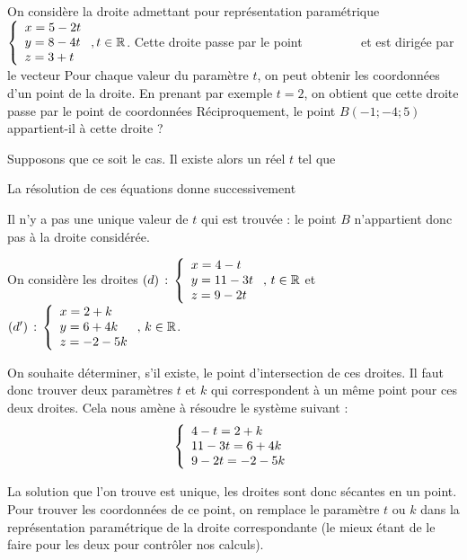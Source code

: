 \documentclass[11pt,fleqn, openany]{book} %
\begin{document}
\begin{example}On considère la droite admettant pour représentation paramétrique $ \left\{\renewcommand{\arraystretch}{1} \begin{array}{l}x=5-2t \\ y=8-4t \\ z =3+t \\

\end{array}\right., t \in \mathbb{R}$.
Cette droite passe par le point $\qquad\qquad$ et est dirigée par le vecteur 
\vskip20pt
Pour chaque valeur du paramètre $t$, on peut obtenir les coordonnées d'un point de la droite. En prenant par exemple $t=2$, on obtient que cette droite passe par le point de coordonnées
\vskip10pt
Réciproquement, le point $B(-1;-4;5)$ appartient-il à cette droite ? 

Supposons que ce soit le cas. Il existe alors un réel $t$ tel que

\vskip20pt

La résolution de ces équations donne successivement 

Il n'y a pas une unique valeur de $t$ qui est trouvée : le point $B$ n'appartient donc pas à la droite considérée.\end{example}

\begin{example}On considère les droites $(d)\,:\,\left\{ \renewcommand{\arraystretch}{1}\begin{array}{l}x=4-t \\ y=11-3t \\ z = 9-2t \\
\end{array}\right.,\, t \in \mathbb{R}$ et $(d')\,:\,\left\{ \renewcommand{\arraystretch}{1}\begin{array}{l}x=2+k \\ y=6+4k \\ z = -2-5k \\
\end{array}\right.,\, k \in \mathbb{R}$.

On souhaite déterminer, s'il existe, le point d'intersection de ces droites. Il faut donc trouver deux paramètres $t$ et $k$ qui correspondent à un même point pour ces deux droites. Cela nous amène à résoudre le système suivant :
\[\left\{\renewcommand{\arraystretch}{1}\begin{array}{l}4-t=2+k \\ 11-3t=6+4k \\ 9-2t=-2-5k \\\end{array}\right.\]

\vskip60pt
La solution que l'on trouve est unique, les droites sont donc sécantes en un point. Pour trouver les coordonnées de ce point, on remplace le paramètre $t$ ou $k$ dans la représentation paramétrique de la droite correspondante (le mieux étant de le faire pour les deux pour contrôler nos calculs).
\vskip30pt

\end{example}
\end{document}

